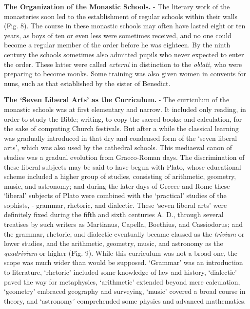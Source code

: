 \documentclass[
]{book}
\begin{document}
\textbf{The Organization of the Monastic Schools.} - The literary work of the monasteries soon led to the establishment of regular schools within their walls (Fig. 8). The course in these monastic schools may often have lasted eight or ten years, as boys of ten or even less were sometimes received, and no one could become a regular member of the order before he was eighteen. By the ninth century the schools sometimes also admitted pupils who never expected to enter the order. These latter were called \emph{externi} in distinction to the \emph{oblati,} who were preparing to become monks. Some training was also given women in convents for nuns, such as that established by the sister of Benedict.

\textbf{The `Seven Liberal Arts' as the Curriculum.} - The curriculum of the monastic schools was at first elementary and narrow. It included only reading, in order to study the Bible; writing, to copy the sacred books; and calculation, for the sake of computing Church festivals. But after a while the classical learning was gradually introduced in that dry and condensed form of the `seven liberal arts', which was also used by the cathedral schools. This mediaeval canon of studies was a gradual evolution from Graeco-Roman days. The discrimination of these liberal subjects may be said to have begun with Plato, whose educational scheme included a higher group of studies, consisting of arithmetic, geometry, music, and astronomy; and during the later days of Greece and Rome these `liberal' subjects of Plato were combined with the `practical' studies of the sophists, - grammar, rhetoric, and dialectic. These `seven liberal arts' were definitely fixed during the fifth and sixth centuries A. D., through several treatises by such writers as Martianus, Capella, Boethius, and Cassiodorus; and the grammar, rhetoric, and dialectic eventually became classed as the \emph{trivium} or lower studies, and the arithmetic, geometry, music, and astronomy as the \emph{quadrivium} or higher (Fig. 9). While this curriculum was not a broad one, the scope was much wider than would be supposed. `Grammar' was an introduction to literature, `rhetoric' included some knowledge of law and history, `dialectic' paved the way for metaphysics, `arithmetic' extended beyond mere calculation, `geometry' embraced geography and surveying, `music' covered a broad course in theory, and `astronomy' comprehended some physics and advanced mathematics.
\end{document}
